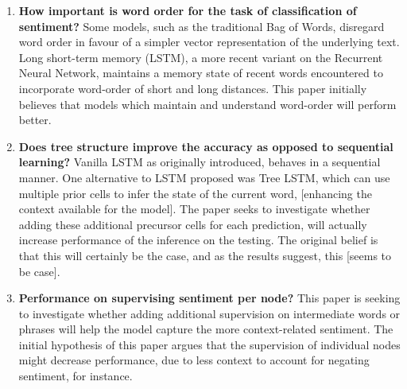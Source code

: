 \begin{enumerate}
    \item \textbf{How important is word order for the task of classification of
    sentiment?} Some models, such as the traditional Bag of Words, disregard
    word order in favour of a simpler vector representation of the underlying
    text. Long short-term memory (LSTM), a more recent variant on the Recurrent
    Neural Network, maintains a memory state of recent words encountered to
    incorporate word-order of short and long distances. This paper initially
    believes that models which maintain and understand word-order will perform
    better. 
    \item \textbf{Does tree structure improve the accuracy as opposed to
    sequential learning?} Vanilla LSTM as originally introduced, behaves in a
    sequential manner. One alternative to LSTM proposed was Tree LSTM, which can
    use multiple prior cells to infer the state of the current word, [enhancing
    the context available for the model]. The paper seeks to investigate whether
    adding these additional precursor cells for each prediction, will actually
    increase performance of the inference on the testing. The original belief is
    that this will certainly be the case, and as the results suggest, this
    [seems to be case].
    \item \textbf{Performance on supervising sentiment per node?}
    This paper is seeking to investigate whether adding additional supervision
    on intermediate words or phrases will help the model capture the more
    context-related sentiment. The initial hypothesis of this paper argues that
    the supervision of individual nodes might decrease performance, due to less
    context to account for negating sentiment, for instance.

\end{enumerate}
